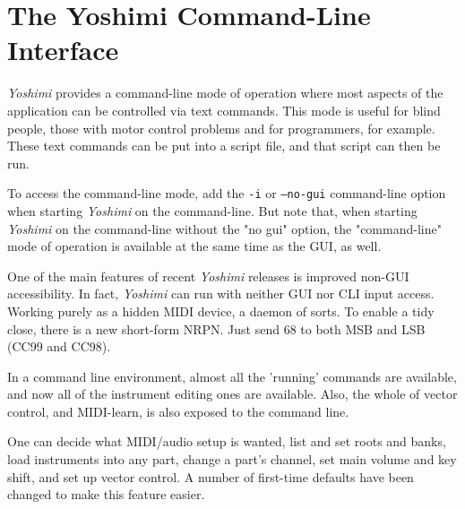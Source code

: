 %
%
%

\section{The Yoshimi Command-Line Interface}
\label{sec:command_line}

   \textsl{Yoshimi} provides a command-line mode of operation where most
   aspects of the application can be controlled via text commands.
   This mode is useful for blind people, those with motor control problems
   and for programmers, for example.
   These text commands can be put into a script file, and that script can then
   be run.

   To access the command-line mode,
   add the \texttt{-i} or \texttt{--no-gui} command-line
   option when starting \textsl{Yoshimi} on the command-line.  But note that,
   when starting \textsl{Yoshimi} on the command-line without the "no gui"
   option, the "command-line" mode
   of operation is available at the same time as the GUI, as well.

   One of the main features of recent \textsl{Yoshimi} releases
   is improved non-GUI accessibility.  In fact,
   \textsl{Yoshimi} can run with neither GUI nor CLI input access. Working
   purely as a hidden MIDI device, a daemon of sorts. To enable a tidy close,
   there is a new short-form NRPN. Just send 68 to both MSB and LSB (CC99 and
   CC98).

   In a command line environment, almost all the 'running' commands are
   available, and now all of the instrument editing ones are available.
   Also, the whole of vector control, and MIDI-learn, is also exposed
   to the command line.

   One can decide what MIDI/audio setup is wanted, list and set roots and
   banks, load instruments into any part, change a part's channel, set main
   volume and key shift, and set up vector control.  A number of first-time
   defaults have been changed to make this feature easier.

